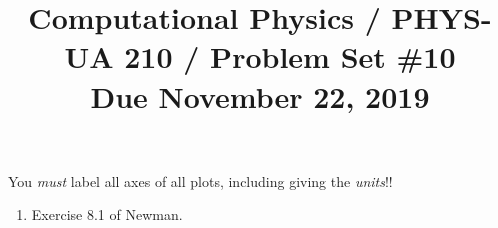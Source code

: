 \documentclass[11pt, preprint]{aastex}
\begin{document}
\title{\bf Computational Physics / PHYS-UA 210 / Problem Set \#10
\\ Due November 22, 2019}

You {\it must} label all axes of all plots, including giving the {\it
  units}!!

\begin{enumerate}
  \item Exercise 8.1 of Newman.
\end{enumerate}
\end{document}
